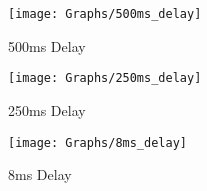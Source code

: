 \begin{figure}[p]
  \centering
  \texttt{[image: Graphs/500ms\_delay]}
  \caption{500ms Delay}
  \label{fig:500ms_graph}
\end{figure}

\begin{figure}[p]
  \centering
  \texttt{[image: Graphs/250ms\_delay]}
  \caption{250ms Delay}
  \label{fig:250ms_graph}
\end{figure}

\begin{figure}[p]
  \centering
  \texttt{[image: Graphs/8ms\_delay]}
  \caption{8ms Delay}
  \label{fig:8ms_graph}
\end{figure}
